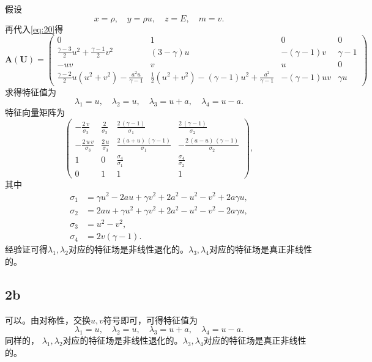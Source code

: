 \documentclass[12pt]{article}
\begin{document}
假设
\begin{equation}
	x=\rho,\quad y=\rho u, \quad z=E,\quad m=v.
	\label{eq:20}
\end{equation}
再代入\cref{eq:20}得
\begin{equation}
	\boldsymbol{A}(\boldsymbol{U})=\begin{pmatrix}
		0 & 1 & 0 &0\\
		\frac{\gamma-3}{2} u^{2} + \frac{\gamma-1}{2}v^2 & (3-\gamma) u & - {(\gamma-1)v}&\gamma-1 \\
		-uv&v&u&0\\
		\frac{\gamma-2}{2}u (u^{2}+v^2)-\frac{a^{2} u}{\gamma-1} & \frac{1}{2} (u^{2}+v^2)-(\gamma-1)u^2+\frac{a^{2}}{\gamma-1} &-(\gamma-1)uv &\gamma u
	\end{pmatrix}
\end{equation}
求得特征值为
\begin{equation}
	\lambda_1 = u,\quad\lambda_2 = u,\quad\lambda_3 = u+a,\quad\lambda_4 = u-a.
\end{equation}
特征向量矩阵为
\begin{equation}
	\begin{pmatrix}
		-\frac{2\,v}{\sigma_3 } & \frac{2}{\sigma_3 } & \frac{2\,{\left(\gamma-1\right)}}{\sigma_1 } & \frac{2\,{\left(\gamma-1\right)}}{\sigma_2 }\\
		-\frac{2\,u\,v}{\sigma_3 } & \frac{2\,u}{\sigma_3 } & \frac{2\,{\left(a+u\right)}\,{\left(\gamma-1\right)}}{\sigma_1 } & -\frac{2\,{\left(a-u\right)}\,{\left(\gamma-1\right)}}{\sigma_2 }\\
		1 & 0 & \frac{\sigma_4 }{\sigma_1 } & \frac{\sigma_4 }{\sigma_2 }\\
		0 & 1 & 1 & 1
	\end{pmatrix},
\end{equation}
其中
\begin{align}
	\sigma_1 &=\gamma u^2 -2au+\gamma v^2 +2a^2 -u^2 -v^2 +2a\gamma u,\\
	\sigma_2 &=2au+\gamma u^2 +\gamma v^2 +2a^2 -u^2 -v^2 -2a\gamma u,\\
	\sigma_3 &=u^2 -v^2, \\
	\sigma_4 &=2v{\left(\gamma-1\right)}.
\end{align}
经验证可得$\lambda_1,\lambda_2$对应的特征场是非线性退化的。$\lambda_3,\lambda_4$对应的特征场是真正非线性的。

\subsection{2b}

可以。由对称性，交换$u,v$符号即可，可得特征值为
\begin{equation}
	\lambda_1 = u,\quad\lambda_2 = u,\quad\lambda_3 = u+a,\quad\lambda_4 = u-a.
\end{equation}
同样的， $\lambda_1,\lambda_2$对应的特征场是非线性退化的。$\lambda_3,\lambda_4$对应的特征场是真正非线性的。





\end{document}
